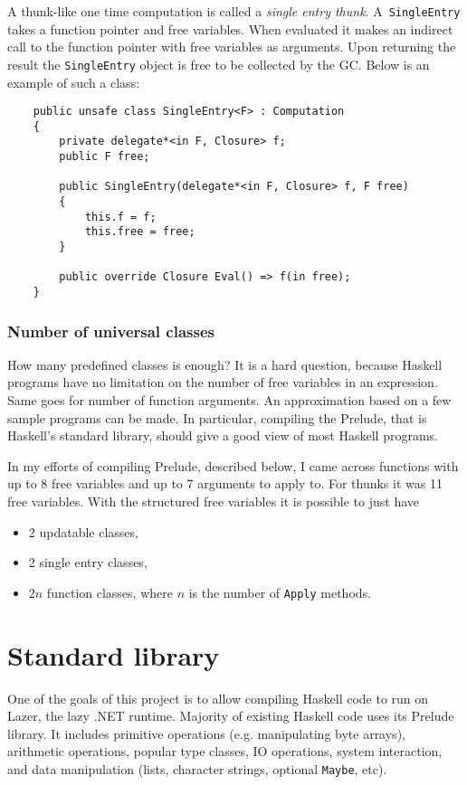 \documentclass[en]{pracamgr}
\begin{document}
A thunk-like one time computation is called a \textit{single entry thunk}.
A~\texttt{SingleEntry} takes a function pointer and free
variables. When evaluated it makes an indirect call to the
function pointer with free variables as arguments.
Upon returning the result the \texttt{SingleEntry} object
is free to be collected by the GC.
Below is an example of such a class:

\begin{verbatim}
    public unsafe class SingleEntry<F> : Computation
    {
        private delegate*<in F, Closure> f;
        public F free;

        public SingleEntry(delegate*<in F, Closure> f, F free)
        {
            this.f = f;
            this.free = free;
        }

        public override Closure Eval() => f(in free);
    }
\end{verbatim}

\subsubsection{Number of universal classes}

How many predefined classes is enough? It is a hard question, because Haskell
programs have no limitation on the number of free variables in an
expression. Same goes for number of function arguments.
An approximation based on a few sample programs can be made.
In particular, compiling the Prelude, that is Haskell's standard
library, should give a good view of most Haskell programs.

In my efforts of compiling Prelude, described below, I came across
functions with up to 8 free variables and up to 7 arguments to apply to.
For thunks it was 11 free variables.
With the structured free variables it is possible to just have
\begin{itemize}
    \item 2 updatable classes,
    \item 2 single entry classes,
    \item $2n$ function classes, where $n$ is the number of \texttt{Apply} methods.
\end{itemize}

\section{Standard library}

One of the goals of this project is to allow compiling
Haskell code to run on Lazer, the lazy .NET runtime.
Majority of existing Haskell code uses its Prelude library.
It includes primitive operations (e.g. manipulating byte arrays),
arithmetic operations, popular type classes,
IO operations, system interaction, and data manipulation
(lists, character strings, optional \texttt{Maybe}, etc).
\end{document}
